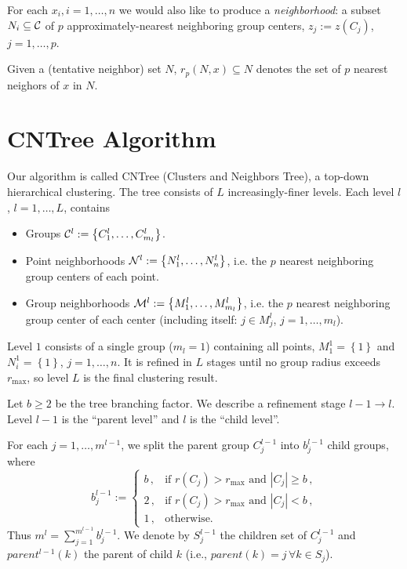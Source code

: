 \documentclass[11pt]{article}
\newcommand{\lb}{\left\{}
\newcommand{\rb}{\right\}}
\newcommand{\rmax}{r_{\text{max}}}
\newcommand{\cC}{{\cal C}}
\newcommand{\cN}{{\cal N}}
\newcommand{\cM}{{\cal M}}
\begin{document}
For each $x_i, i=1,\dots,n$ we would also like to produce a {\it neighborhood}: a subset $N_i \subseteq \cC$ of $p$ approximately-nearest neighboring group centers, $z_j := z(C_j)$, $j=1,\dots,p$.

Given a (tentative neighbor) set $N$, $r_p(N,x) \subseteq N$ denotes the set of $p$ nearest neighors of $x$ in $N$.

\section{CNTree Algorithm}
Our algorithm is called CNTree (Clusters and Neighbors Tree), a top-down hierarchical clustering. The tree consists of $L$ increasingly-finer levels. Each level $l$, $l=1,\dots,L$, contains 
\begin{itemize}
	\item Groups $\cC^l := \lb C^l_1,\dots,C^l_{m_l}\rb$.
	\item Point neighborhoods $\cN^l := \lb N^l_1,\dots,N^l_n\rb $, i.e. the $p$ nearest neighboring group centers of each point.
	\item Group neighborhoods $\cM^l := \lb M^l_1,\dots,M^l_{m_l}\rb$, i.e. the $p$ nearest neighboring group center of each center (including itself: $j \in M^l_j$, $j=1,\dots,m_l$).
\end{itemize}

Level $1$ consists of a single group ($m_l=1$) containing all points, $M^1_1 = \lb 1\rb $ and $N^1_i = \lb 1\rb $, $j=1,\dots,n$. It is refined in $L$ stages until no group radius exceeds $\rmax$, so level $L$ is the final clustering result. 

Let $b \geq 2$ be the tree branching factor. We describe a refinement stage $l-1 \rightarrow l$. Level $l-1$ is the ``parent level'' and $l$ is the ``child level''.

For each $j=1,\dots,m^{l-1}$, we split the parent group $C^{l-1}_j$ into $b^{l-1}_j$ child groups, where
\begin{equation}
	b^{l-1}_j := 
	\begin{cases}
		b\,, &\mbox{if } r(C_j) > \rmax \text{ and } |C_j| \geq b\,, \\ 
		2\,, &\mbox{if } r(C_j) > \rmax \text{ and } |C_j| < b \,, \\ 
		1\,, &\mbox{otherwise.}
    \end{cases}
    \label{kj}
\end{equation}
Thus $m^l = \sum_{j=1}^{m^{l-1}} b^{l-1}_j$. We denote by $S^{l-1}_j$ the children set of $C^{l-1}_j$ and $parent^{l-1}(k)$ the parent of child $k$ (i.e., $parent(k) = j\, \forall k \in S_j$).
\end{document}
